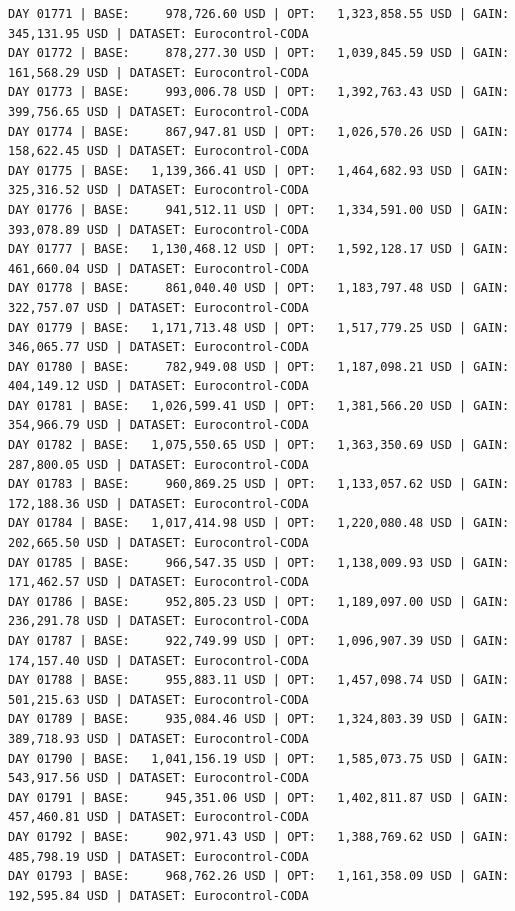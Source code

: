 \documentclass[11pt,a4paper]{article}
\begin{document}
\begin{verbatim}
DAY 01771 | BASE:     978,726.60 USD | OPT:   1,323,858.55 USD | GAIN: 345,131.95 USD | DATASET: Eurocontrol-CODA
DAY 01772 | BASE:     878,277.30 USD | OPT:   1,039,845.59 USD | GAIN: 161,568.29 USD | DATASET: Eurocontrol-CODA
DAY 01773 | BASE:     993,006.78 USD | OPT:   1,392,763.43 USD | GAIN: 399,756.65 USD | DATASET: Eurocontrol-CODA
DAY 01774 | BASE:     867,947.81 USD | OPT:   1,026,570.26 USD | GAIN: 158,622.45 USD | DATASET: Eurocontrol-CODA
DAY 01775 | BASE:   1,139,366.41 USD | OPT:   1,464,682.93 USD | GAIN: 325,316.52 USD | DATASET: Eurocontrol-CODA
DAY 01776 | BASE:     941,512.11 USD | OPT:   1,334,591.00 USD | GAIN: 393,078.89 USD | DATASET: Eurocontrol-CODA
DAY 01777 | BASE:   1,130,468.12 USD | OPT:   1,592,128.17 USD | GAIN: 461,660.04 USD | DATASET: Eurocontrol-CODA
DAY 01778 | BASE:     861,040.40 USD | OPT:   1,183,797.48 USD | GAIN: 322,757.07 USD | DATASET: Eurocontrol-CODA
DAY 01779 | BASE:   1,171,713.48 USD | OPT:   1,517,779.25 USD | GAIN: 346,065.77 USD | DATASET: Eurocontrol-CODA
DAY 01780 | BASE:     782,949.08 USD | OPT:   1,187,098.21 USD | GAIN: 404,149.12 USD | DATASET: Eurocontrol-CODA
DAY 01781 | BASE:   1,026,599.41 USD | OPT:   1,381,566.20 USD | GAIN: 354,966.79 USD | DATASET: Eurocontrol-CODA
DAY 01782 | BASE:   1,075,550.65 USD | OPT:   1,363,350.69 USD | GAIN: 287,800.05 USD | DATASET: Eurocontrol-CODA
DAY 01783 | BASE:     960,869.25 USD | OPT:   1,133,057.62 USD | GAIN: 172,188.36 USD | DATASET: Eurocontrol-CODA
DAY 01784 | BASE:   1,017,414.98 USD | OPT:   1,220,080.48 USD | GAIN: 202,665.50 USD | DATASET: Eurocontrol-CODA
DAY 01785 | BASE:     966,547.35 USD | OPT:   1,138,009.93 USD | GAIN: 171,462.57 USD | DATASET: Eurocontrol-CODA
DAY 01786 | BASE:     952,805.23 USD | OPT:   1,189,097.00 USD | GAIN: 236,291.78 USD | DATASET: Eurocontrol-CODA
DAY 01787 | BASE:     922,749.99 USD | OPT:   1,096,907.39 USD | GAIN: 174,157.40 USD | DATASET: Eurocontrol-CODA
DAY 01788 | BASE:     955,883.11 USD | OPT:   1,457,098.74 USD | GAIN: 501,215.63 USD | DATASET: Eurocontrol-CODA
DAY 01789 | BASE:     935,084.46 USD | OPT:   1,324,803.39 USD | GAIN: 389,718.93 USD | DATASET: Eurocontrol-CODA
DAY 01790 | BASE:   1,041,156.19 USD | OPT:   1,585,073.75 USD | GAIN: 543,917.56 USD | DATASET: Eurocontrol-CODA
DAY 01791 | BASE:     945,351.06 USD | OPT:   1,402,811.87 USD | GAIN: 457,460.81 USD | DATASET: Eurocontrol-CODA
DAY 01792 | BASE:     902,971.43 USD | OPT:   1,388,769.62 USD | GAIN: 485,798.19 USD | DATASET: Eurocontrol-CODA
DAY 01793 | BASE:     968,762.26 USD | OPT:   1,161,358.09 USD | GAIN: 192,595.84 USD | DATASET: Eurocontrol-CODA

\end{verbatim}
\end{document}
